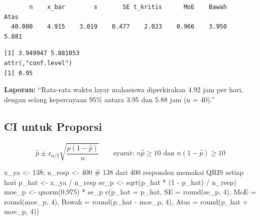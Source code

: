 \documentclass[
  indonesian,
  letterpaper,
]{book}
\newenvironment{Shaded}{\begin{snugshade}}{\end{snugshade}}
\newcommand{\AttributeTok}[1]{\textcolor[rgb]{0.40,0.45,0.13}{#1}}
\newcommand{\CommentTok}[1]{\textcolor[rgb]{0.37,0.37,0.37}{#1}}
\newcommand{\DecValTok}[1]{\textcolor[rgb]{0.68,0.00,0.00}{#1}}
\newcommand{\FloatTok}[1]{\textcolor[rgb]{0.68,0.00,0.00}{#1}}
\newcommand{\FunctionTok}[1]{\textcolor[rgb]{0.28,0.35,0.67}{#1}}
\newcommand{\NormalTok}[1]{\textcolor[rgb]{0.00,0.23,0.31}{#1}}
\newcommand{\OtherTok}[1]{\textcolor[rgb]{0.00,0.23,0.31}{#1}}
\newcommand{\SpecialCharTok}[1]{\textcolor[rgb]{0.37,0.37,0.37}{#1}}
\begin{document}
\begin{verbatim}
       n    x_bar        s       SE t_kritis      MoE    Bawah     Atas 
  40.000    4.915    3.019    0.477    2.023    0.966    3.950    5.881 
\end{verbatim}

\begin{Shaded}
\end{Shaded}

\begin{verbatim}
[1] 3.949947 5.881053
attr(,"conf.level")
[1] 0.95
\end{verbatim}

\textbf{Laporan:} ``Rata-rata waktu layar mahasiswa diperkirakan 4.92
jam per hari, dengan selang kepercayaan 95\% antara 3.95 dan 5.88 jam (n
= 40).''

\subsection{CI untuk Proporsi}\label{ci-untuk-proporsi}

\[\hat{p} \pm z_{\alpha/2}\sqrt{\frac{\hat{p}(1-\hat{p})}{n}} \qquad \text{syarat: } n\hat{p} \geq 10 \text{ dan } n(1-\hat{p}) \geq 10\]

\begin{Shaded}
\begin{Highlighting}[]
\NormalTok{x\_ya }\OtherTok{\textless{}{-}} \DecValTok{138}\NormalTok{; n\_resp }\OtherTok{\textless{}{-}} \DecValTok{400}      \CommentTok{\# 138 dari 400 responden memakai QRIS setiap hari}
\NormalTok{p\_hat }\OtherTok{\textless{}{-}}\NormalTok{ x\_ya }\SpecialCharTok{/}\NormalTok{ n\_resp}
\NormalTok{se\_p  }\OtherTok{\textless{}{-}} \FunctionTok{sqrt}\NormalTok{(p\_hat }\SpecialCharTok{*}\NormalTok{ (}\DecValTok{1} \SpecialCharTok{{-}}\NormalTok{ p\_hat) }\SpecialCharTok{/}\NormalTok{ n\_resp)}
\NormalTok{moe\_p }\OtherTok{\textless{}{-}} \FunctionTok{qnorm}\NormalTok{(}\FloatTok{0.975}\NormalTok{) }\SpecialCharTok{*}\NormalTok{ se\_p}
\FunctionTok{c}\NormalTok{(}\AttributeTok{p\_hat =}\NormalTok{ p\_hat, }\AttributeTok{SE =} \FunctionTok{round}\NormalTok{(se\_p, }\DecValTok{4}\NormalTok{), }\AttributeTok{MoE =} \FunctionTok{round}\NormalTok{(moe\_p, }\DecValTok{4}\NormalTok{),}
  \AttributeTok{Bawah =} \FunctionTok{round}\NormalTok{(p\_hat }\SpecialCharTok{{-}}\NormalTok{ moe\_p, }\DecValTok{4}\NormalTok{), }\AttributeTok{Atas =} \FunctionTok{round}\NormalTok{(p\_hat }\SpecialCharTok{+}\NormalTok{ moe\_p, }\DecValTok{4}\NormalTok{))}
\end{Highlighting}
\end{Shaded}
\end{document}
